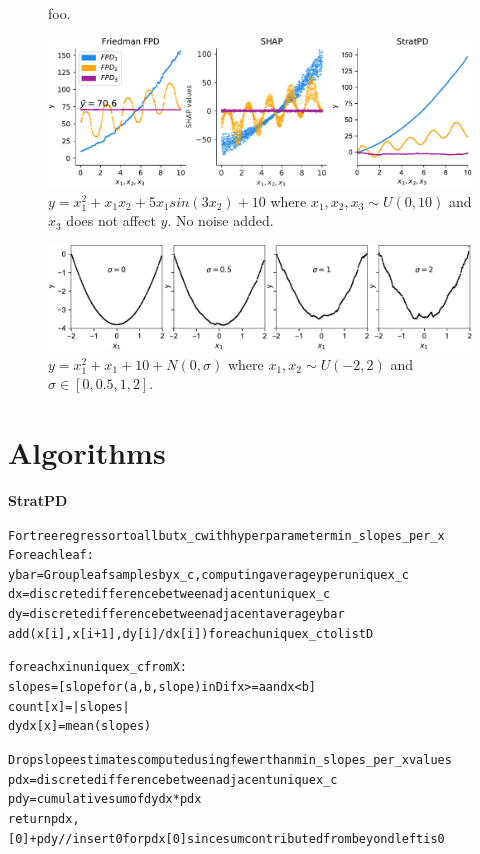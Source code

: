 \documentclass{article}
\begin{document}
\begin{figure}[htbp]
\begin{center}
\caption{\small foo.}
\label{fig:pregnant}
\end{center}
\end{figure}

\begin{figure}[htbp]
\begin{center}
\includegraphics[scale=0.4]{images/interactions.pdf}
\caption{\small $y = x_1^2 + x_1 x_2 + 5 x_1 sin(3 x_2) + 10$ where $x_1,x_2,x_3 \sim U(0,10)$ and $x_3$ does not affect $y$. No noise added.}
\label{fig:interactions}
\end{center}
\end{figure}

\begin{figure}[htbp]
\begin{center}
\includegraphics[scale=0.4]{images/noise.pdf}
\caption{\small $y = x_1^2 + x_1 + 10 + N(0,\sigma)$ where $x_1,x_2 \sim U(-2,2)$ and $\sigma \in [0,0.5,1,2]$.}
\label{fig:noise}
\end{center}
\end{figure}


\pagebreak
\section{Algorithms}

{\bf StratPD}\begin{alltt}\small
For tree regressor to all but x_c with hyper parameter min_slopes_per_x
For each leaf:
    y bar = Group leaf samples by x_c, computing average y per unique x_c
    dx = discrete difference between adjacent unique x_c
    dy = discrete difference between adjacent average y bar
    add (x[i], x[i+1], dy[i]/dx[i]) for each unique x_c to list D

for each x in unique x_c from X:
    slopes = [slope for (a, b, slope) in D if x >= a and x < b]
    count[x] = |slopes|
    dydx[x] = mean(slopes)

Drop slope estimates computed using fewer than min_slopes_per_x values
pdx = discrete difference between adjacent unique x_c
pdy = cumulative sum of dydx * pdx
return pdx, [0]+pdy  // insert 0 for pdx[0] since sum contributed from beyond left is 0
\end{alltt}
\end{document}
